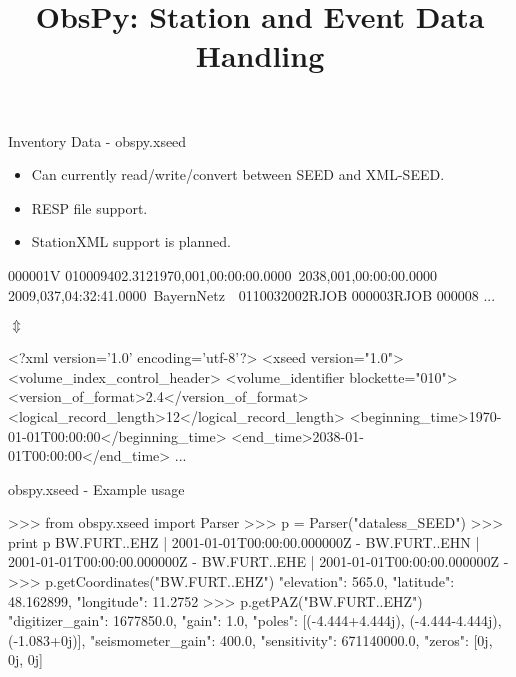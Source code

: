 
\title{ObsPy: Station and Event Data Handling}


\frame[plain]{\titlepage}



\begin{frame}{Inventory Data - obspy.xseed}
    \begin{itemize}
        \item Can currently read/write/convert between SEED and XML-SEED.
        \item RESP file support.
        \item StationXML support is planned.
    \end{itemize}


\footnotesize
\begin{myColorBox}{0.95}{}
\begin{semiverbatim}
000001V 010009402.3121970,001,00:00:00.0000~2038,001,00:00:00.0000~
2009,037,04:32:41.0000~BayernNetz~~0110032002RJOB 000003RJOB 000008
...
\end{semiverbatim}
\end{myColorBox}

\large
\begin{center}
    $\Updownarrow$
\end{center}

\footnotesize


\begin{myColorBox}{0.95}{}
\begin{semiverbatim}
<?xml version='1.0' encoding='utf-8'?>
<xseed version="1.0">
  <volume_index_control_header>
    <volume_identifier blockette="010">
      <version_of_format>2.4</version_of_format>
      <logical_record_length>12</logical_record_length>
      <beginning_time>1970-01-01T00:00:00</beginning_time>
      <end_time>2038-01-01T00:00:00</end_time>
...
\end{semiverbatim}
\end{myColorBox}

\normalsize

\end{frame}


\begin{frame}{obspy.xseed - Example usage}
\begin{myColorBox}{0.95}{}
\begin{python}
>>> from obspy.xseed import Parser
>>> p = Parser("dataless_SEED")
>>> print p
BW.FURT..EHZ | 2001-01-01T00:00:00.000000Z -
BW.FURT..EHN | 2001-01-01T00:00:00.000000Z -
BW.FURT..EHE | 2001-01-01T00:00:00.000000Z -
>>> p.getCoordinates("BW.FURT..EHZ")
{"elevation": 565.0, "latitude": 48.162899,
 "longitude": 11.2752}
>>> p.getPAZ("BW.FURT..EHZ")
{"digitizer_gain": 1677850.0,
 "gain": 1.0,
 "poles": [(-4.444+4.444j), (-4.444-4.444j), (-1.083+0j)],
 "seismometer_gain": 400.0,
 "sensitivity": 671140000.0,
 "zeros": [0j, 0j, 0j]}
\end{python}
\end{myColorBox}
\end{frame}



